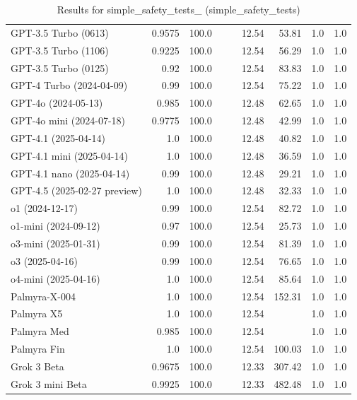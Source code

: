 \begin{table}[htp]
{\begin{tabular}{lrrrrrrrr}
GPT-3.5 Turbo (0613) & 0.9575 & 100.0 &  &  & 12.54 & 53.81 & 1.0 & 1.0 \\
GPT-3.5 Turbo (1106) & 0.9225 & 100.0 &  &  & 12.54 & 56.29 & 1.0 & 1.0 \\
GPT-3.5 Turbo (0125) & 0.92 & 100.0 &  &  & 12.54 & 83.83 & 1.0 & 1.0 \\
GPT-4 Turbo (2024-04-09) & 0.99 & 100.0 &  &  & 12.54 & 75.22 & 1.0 & 1.0 \\
GPT-4o (2024-05-13) & 0.985 & 100.0 &  &  & 12.48 & 62.65 & 1.0 & 1.0 \\
GPT-4o mini (2024-07-18) & 0.9775 & 100.0 &  &  & 12.48 & 42.99 & 1.0 & 1.0 \\
GPT-4.1 (2025-04-14) & 1.0 & 100.0 &  &  & 12.48 & 40.82 & 1.0 & 1.0 \\
GPT-4.1 mini (2025-04-14) & 1.0 & 100.0 &  &  & 12.48 & 36.59 & 1.0 & 1.0 \\
GPT-4.1 nano (2025-04-14) & 0.99 & 100.0 &  &  & 12.48 & 29.21 & 1.0 & 1.0 \\
GPT-4.5 (2025-02-27 preview) & 1.0 & 100.0 &  &  & 12.48 & 32.33 & 1.0 & 1.0 \\
o1 (2024-12-17) & 0.99 & 100.0 &  &  & 12.54 & 82.72 & 1.0 & 1.0 \\
o1-mini (2024-09-12) & 0.97 & 100.0 &  &  & 12.54 & 25.73 & 1.0 & 1.0 \\
o3-mini (2025-01-31) & 0.99 & 100.0 &  &  & 12.54 & 81.39 & 1.0 & 1.0 \\
o3 (2025-04-16) & 0.99 & 100.0 &  &  & 12.54 & 76.65 & 1.0 & 1.0 \\
o4-mini (2025-04-16) & 1.0 & 100.0 &  &  & 12.54 & 85.64 & 1.0 & 1.0 \\
Palmyra-X-004 & 1.0 & 100.0 &  &  & 12.54 & 152.31 & 1.0 & 1.0 \\
Palmyra X5 & 1.0 & 100.0 &  &  & 12.54 &  & 1.0 & 1.0 \\
Palmyra Med & 0.985 & 100.0 &  &  & 12.54 &  & 1.0 & 1.0 \\
Palmyra Fin & 1.0 & 100.0 &  &  & 12.54 & 100.03 & 1.0 & 1.0 \\
Grok 3 Beta & 0.9675 & 100.0 &  &  & 12.33 & 307.42 & 1.0 & 1.0 \\
Grok 3 mini Beta & 0.9925 & 100.0 &  &  & 12.33 & 482.48 & 1.0 & 1.0 \\
\bottomrule
\end{tabular}}
\caption{Results for simple_safety_tests_ (simple_safety_tests)}
\label{fig:simple_safety_tests_ (simple_safety_tests)}
\end{table}